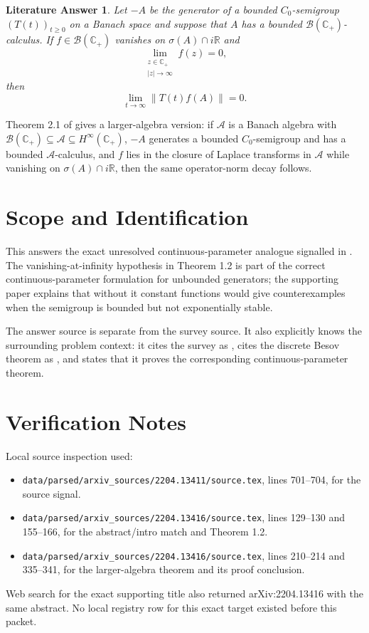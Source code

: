 \documentclass[11pt]{article}
\newtheorem*{theorem}{Literature Answer}
\begin{document}
\begin{theorem}
Let \(-A\) be the generator of a bounded \(C_0\)-semigroup \((T(t))_{t\ge 0}\)
on a Banach space and suppose that \(A\) has a bounded
\(\mathcal B(\mathbb C_+)\)-calculus. If \(f\in \mathcal B(\mathbb C_+)\)
vanishes on \(\sigma(A)\cap i\mathbb R\) and
\[
  \lim_{\substack{z\in \mathbb C_+\\ |z|\to\infty}} f(z)=0,
\]
then
\[
  \lim_{t\to\infty}\|T(t)f(A)\|=0.
\]
\end{theorem}

Theorem 2.1 of \cite{BScontinuous} gives a larger-algebra version: if
\(\mathcal A\) is a Banach algebra with
\(\mathcal B(\mathbb C_+)\subseteq \mathcal A\subseteq H^\infty(\mathbb C_+)\),
\(-A\) generates a bounded \(C_0\)-semigroup and has a bounded
\(\mathcal A\)-calculus, and \(f\) lies in the closure of Laplace transforms in
\(\mathcal A\) while vanishing on \(\sigma(A)\cap i\mathbb R\), then the same
operator-norm decay follows.

\section*{Scope and Identification}

This answers the exact unresolved continuous-parameter analogue signalled in
\cite{BSsurvey}. The vanishing-at-infinity hypothesis in Theorem 1.2 is part of
the correct continuous-parameter formulation for unbounded generators; the
supporting paper explains that without it constant functions would give
counterexamples when the semigroup is bounded but not exponentially stable.

The answer source is separate from the survey source. It also explicitly knows
the surrounding problem context: it cites the survey as \cite{BSsurvey}, cites
the discrete Besov theorem as \cite{BSdiscrete}, and states that it proves the
corresponding continuous-parameter theorem.

\section*{Verification Notes}

Local source inspection used:
\begin{itemize}
\item \texttt{data/parsed/arxiv\_sources/2204.13411/source.tex}, lines
701--704, for the source signal.
\item \texttt{data/parsed/arxiv\_sources/2204.13416/source.tex}, lines
129--130 and 155--166, for the abstract/intro match and Theorem 1.2.
\item \texttt{data/parsed/arxiv\_sources/2204.13416/source.tex}, lines
210--214 and 335--341, for the larger-algebra theorem and its proof conclusion.
\end{itemize}
Web search for the exact supporting title also returned arXiv:2204.13416 with
the same abstract. No local registry row for this exact target existed before
this packet.
\end{document}
